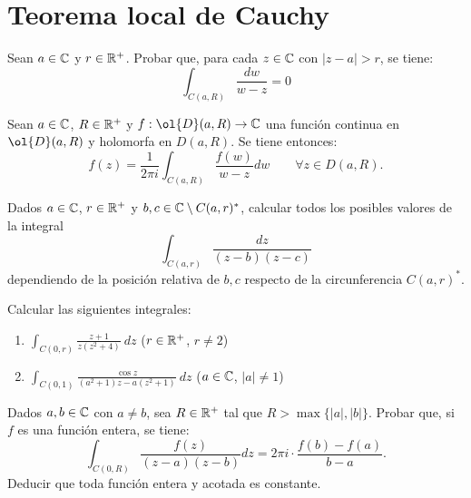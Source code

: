 \section{Teorema local de Cauchy}

\begin{ejercicio}
    Sean $a \in \mathbb{C}$ y $r \in \mathbb{R}^+$. Probar que, para cada $z \in \mathbb{C}$ con $|z-a| > r$, se tiene:
    \[
        \int_{C(a,R)} \frac{dw}{w-z} = 0
    \]
\end{ejercicio}

\begin{ejercicio}
    Sean $a \in \mathbb{C}$, $R \in \mathbb{R}^+$ y $f : \ol{D}(a,R) \to \bb{C}$ una función continua en $\ol{D}(a,R)$ y holomorfa en $D(a,R)$. Se tiene entonces:
    \[
        f(z) = \frac{1}{2\pi i} \int_{C(a,R)} \frac{f(w)}{w-z}dw \qquad \forall z \in D(a,R).
    \]
\end{ejercicio}

\begin{ejercicio}
    Dados $a \in \mathbb{C}$, $r \in \mathbb{R}^+$ y $b,c \in \mathbb{C}\setminus C(a,r)^\ast$, calcular todos los posibles valores de la integral
    \[
        \int_{C(a,r)} \frac{dz}{(z-b)(z-c)}
    \]
    dependiendo de la posición relativa de $b,c$ respecto de la circunferencia $C(a,r)^\ast$.
\end{ejercicio}

\begin{ejercicio}
    Calcular las siguientes integrales:
    \begin{enumerate}
        \item $\displaystyle\int_{C(0,r)} \frac{z+1}{z(z^2+4)}\ dz$ \qquad ($r \in \mathbb{R}^+$, $r \neq 2$)
        \item $\displaystyle\int_{C(0,1)} \frac{\cos z}{(a^2+1)z - a(z^2+1)}\ dz$ \qquad ($a \in \mathbb{C}$, $|a| \neq 1$)
    \end{enumerate}
\end{ejercicio}

\begin{ejercicio}
    Dados $a,b \in \mathbb{C}$ con $a \neq b$, sea $R \in \mathbb{R}^+$ tal que $R > \max\{|a|,|b|\}$. Probar que, si $f$ es una función entera, se tiene:
    \[
        \int_{C(0,R)} \frac{f(z)}{(z-a)(z-b)}dz = 2\pi i \cdot \frac{f(b)-f(a)}{b-a}.
    \]
    Deducir que toda función entera y acotada es constante.
\end{ejercicio}